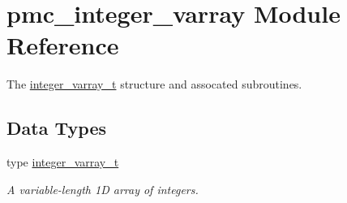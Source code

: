 \hypertarget{namespacepmc__integer__varray}{}\section{pmc\+\_\+integer\+\_\+varray Module Reference}
\label{namespacepmc__integer__varray}


The \mbox{\hyperlink{structpmc__integer__varray_1_1integer__varray__t}{integer\+\_\+varray\+\_\+t}} structure and assocated subroutines.  


\subsection*{Data Types}
\begin{DoxyCompactItemize}
\item 
type \mbox{\hyperlink{structpmc__integer__varray_1_1integer__varray__t}{integer\+\_\+varray\+\_\+t}}
\begin{DoxyCompactList}\small\item\em A variable-\/length 1D array of integers. \end{DoxyCompactList}\end{DoxyCompactItemize}
